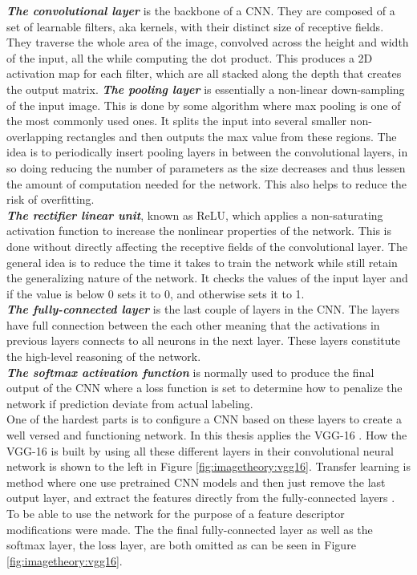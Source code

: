 \textbf{\emph{The convolutional layer}} is the backbone of a CNN. They are composed of a set of learnable filters, aka kernels, with their distinct size of receptive fields. They traverse the whole area of the image, convolved across the height and width of the input, all the while computing the dot product. This produces a 2D activation map for each filter, which are all stacked along the depth that creates the output matrix.
\textbf{\emph{The pooling layer}} is essentially a non-linear down-sampling of the input image. This is done by some algorithm where max pooling is one of the most commonly used ones. It splits the input into several smaller non-overlapping rectangles and then outputs the max value from these regions. The idea is to periodically insert pooling layers in between the convolutional layers, in so doing reducing the number of parameters as the size decreases and thus lessen the amount of computation needed for the network. This also helps to reduce the risk of overfitting. \\
\textbf{\emph{The rectifier linear unit}}, known as ReLU, which applies a non-saturating activation function to increase the nonlinear properties of the network. This is done without directly affecting the receptive fields of the convolutional layer. The general idea is to reduce the time it takes to train the network while still retain the generalizing nature of the network. It checks the values of the input layer and if the value is below 0 sets it to 0, and otherwise sets it to 1.\\
\textbf{\emph{The fully-connected layer}} is the last couple of layers in the CNN. The layers have full connection between the each other meaning that the activations in previous layers connects to all neurons in the next layer. These layers constitute the high-level reasoning of the network. \\
\textbf{\emph{The softmax activation function}} is normally used to produce the final output of the CNN where a loss function is set to determine how to penalize the network if prediction deviate from actual labeling. \\

One of the hardest parts is to configure a CNN based on these layers to create a well versed and functioning network. In this thesis applies the VGG-16 \cite{simonyan2014very}. How the VGG-16 is built by using all these different layers in their convolutional neural network is shown to the left in Figure \ref{fig:imagetheory:vgg16}. Transfer learning is method where one use pretrained CNN models and then just remove the last output layer, and extract the features directly from the fully-connected layers \cite{koskela2014convolutional}. To be able to use the network for the purpose of a feature descriptor modifications were made. The the final fully-connected layer as well as the softmax layer, the loss layer, are both omitted as can be seen in Figure \ref{fig:imagetheory:vgg16}. 

